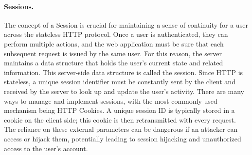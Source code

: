 \paragraph{Sessions.} The concept of a Session is crucial for maintaining a sense of continuity for a user across the stateless HTTP protocol. Once a user is authenticated, they can perform multiple actions, and the web application must be sure that each subsequent request is issued by the same user. For this reason, the server maintains a data structure that holds the user's current state and related information. This server-side data structure is called the session. Since HTTP is stateless, a unique session identifier must be constantly sent by the client and received by the server to look up and update the user's activity. There are many ways to manage and implement sessions, with the most commonly used mechanism being HTTP Cookies. A unique session ID is typically stored in a cookie on the client side; this cookie is then retransmitted with every request. The reliance on these external parameters can be dangerous if an attacker can access or hijack them, potentially leading to session hijacking and unauthorized access to the user's account.